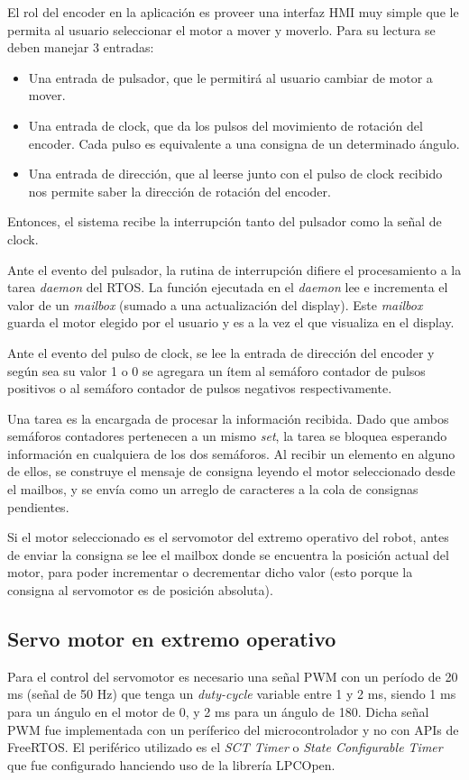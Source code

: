 \documentclass{IEEEtran}
\begin{document}
El rol del encoder en la aplicación es proveer una interfaz HMI muy simple que le permita al usuario seleccionar el motor a mover y moverlo. Para su lectura se deben manejar 3 entradas:

\begin{itemize}
    \item Una entrada de pulsador, que le permitirá al usuario cambiar de motor a mover.
    \item Una entrada de clock, que da los pulsos del movimiento de rotación del encoder. Cada pulso es equivalente a una consigna de un determinado ángulo.
    \item Una entrada de dirección, que al leerse junto con el pulso de clock recibido nos permite saber la dirección de rotación del encoder.
\end{itemize}

Entonces, el sistema recibe la interrupción tanto del pulsador como la señal de clock.

Ante el evento del pulsador, la rutina de interrupción difiere el procesamiento a la tarea \textit{daemon} del RTOS. La función ejecutada en el \textit{daemon} lee e incrementa el valor de un \textit{mailbox} (sumado a una actualización del display). Este \textit{mailbox} guarda el motor elegido por el usuario y es a la vez el que visualiza en el display.

Ante el evento del pulso de clock, se lee la entrada de dirección del encoder y según sea su valor 1 o 0 se agregara un ítem al semáforo contador de pulsos positivos o al semáforo contador de pulsos negativos respectivamente.

Una tarea es la encargada de procesar la información recibida. Dado que ambos semáforos contadores pertenecen a un mismo \textit{set}, la tarea se bloquea esperando información en cualquiera de los dos semáforos. Al recibir un elemento en alguno de ellos, se construye el mensaje de consigna leyendo el motor seleccionado desde el mailbos, y se envía como un arreglo de caracteres a la cola de consignas pendientes.

Si el motor seleccionado es el servomotor del extremo operativo del robot, antes de enviar la consigna se lee el mailbox donde se encuentra la posición actual del motor, para poder incrementar o decrementar dicho valor (esto porque la consigna al servomotor es de posición absoluta).

\subsection{Servo motor en extremo operativo}
Para el control del servomotor es necesario una señal PWM con un período de 20 ms (señal de 50 Hz) que tenga un \textit{duty-cycle} variable entre 1 y 2 ms, siendo 1 ms para un ángulo en el motor de 0\degree, y 2 ms para un ángulo de 180\degree. Dicha señal PWM fue implementada con un períferico del microcontrolador y no con APIs de FreeRTOS. El periférico utilizado es el \textit{SCT Timer} o \textit{State Configurable Timer} que fue configurado hanciendo uso de la librería LPCOpen.
\end{document}
